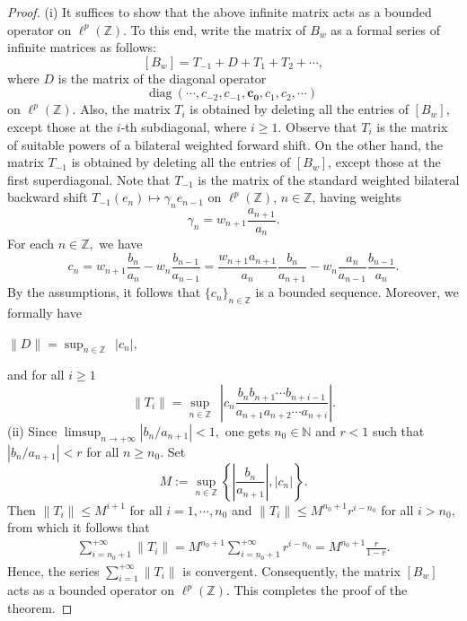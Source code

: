 \documentclass[12pt, reqno]{amsart}
\theoremstyle{definition}
\theoremstyle{remark}
\numberwithin{equation}{section}
\begin{document}
   \begin{proof}
(i) It suffices to show that the above infinite matrix acts as a bounded operator on $\ell^p(\mathbb{Z})$. To this end, write the matrix of $B_{w}$ as a formal series of infinite matrices as follows:
\[
 [B_{w}]=T_{-1}+D+T_{1}+T_{2}+\cdots,
 \]
where $D$ is the matrix of the diagonal operator 
\[
\text{diag}~ (\cdots,c_{-2},c_{-1},\boxed{\boldsymbol{c_{0}}},c_{1},c_{2},\cdots)
\]
on $\ell^{p}(\mathbb{Z}).$ Also, the matrix $T_i$ is obtained by deleting all the entries of $[B_{w}]$, except those at the $i$-th subdiagonal, where $i\geq 1$. Observe that $T_i$ is the matrix of suitable powers of a bilateral weighted forward shift.  On the other hand, the matrix $T_{-1}$ is obtained by deleting all the entries of $[B_{w}]$, except those at the first superdiagonal. Note that $T_{- 1}$ is the matrix of the standard weighted bilateral backward shift $T_{-1}(e_n)\mapsto \gamma_n e_{n-1}$ on $\ell^p(\mathbb{Z})$, $n\in \mathbb{Z}$, having weights 
\[
\gamma_n= w_{n+1}\frac{a_{n+1}}{a_{n}}. 
\]
For each $n \in \mathbb{Z},$ we have
\[
c_{n}=w_{n+1}\frac{b_{n}}{a_{n}}-w_{n}\frac{b_{n-1}}{a_{n-1}}=\frac{w_{n+1}a_{n+1}}{a_{n}}\frac{b_{n}}{a_{n+1}}-w_{n}\frac{a_n}{a_{n-1}}\frac{b_{n-1}}{a_{n}}.
\]
By the assumptions, it follows that $\{c_{n}\}_{n\in \mathbb{Z}}$ is a bounded sequence. Moreover, we formally have
\begin{center}
$\lVert D \rVert=  \sup_{n\in \mathbb{Z}}~~\lvert c_{n}\rvert, $
\end{center}
and for all $i\geq 1$
\[
 \lVert T_{i}\rVert=\sup_{n\in\mathbb{Z}}~~\left\lvert c_{n}\frac{b_{n}b_{n+1}\cdots b_{n+i-1}}{a_{n+1}a_{n+2}\cdots a_{n+i}}\right\rvert.
\]
(ii) Since
$ \limsup_{ n\rightarrow +\infty} \left\lvert b_n/a_{n+1}\right\rvert<1,$
one gets $n_{0}\in\mathbb{N}$ and $r<1$ such that $|b_n/a_{n+1}|<r$ for all $n\geq n_{0}$. Set
\[
M:=\sup_{n\in \mathbb{Z}}\left\{\left\lvert\frac{b_{n}}{a_{n+1}}\right\rvert,|c_{n}|\right\}.
\]
Then $\lVert T_{i}\rVert\leq M^{i+1}$ for all $i=1,\cdots ,n_{0}$ and $\lVert T_{i}\rVert\leq M^{n_{0}+1}r^{i-n_{0}}$ for all $i> n_{0},$ from which it follows that
\begin{eqnarray*}
    \sum_{i=n_{0}+1}^{+\infty}\lVert T_{i}\rVert=M^{n_{0}+1}\sum_{i=n_{0}+1}^{+\infty}r^{i-n_{0}}=M^{n_{0}+1}\frac{r}{1-r}.
\end{eqnarray*}
Hence, the series
$\sum_{i=1}^{+\infty}\lVert T_{i}\rVert$ is convergent. Consequently, the matrix $[B_w]$ acts as a bounded operator on $\ell^p(\mathbb{Z})$. This completes the proof of the theorem. 
   \end{proof}
\end{document}
